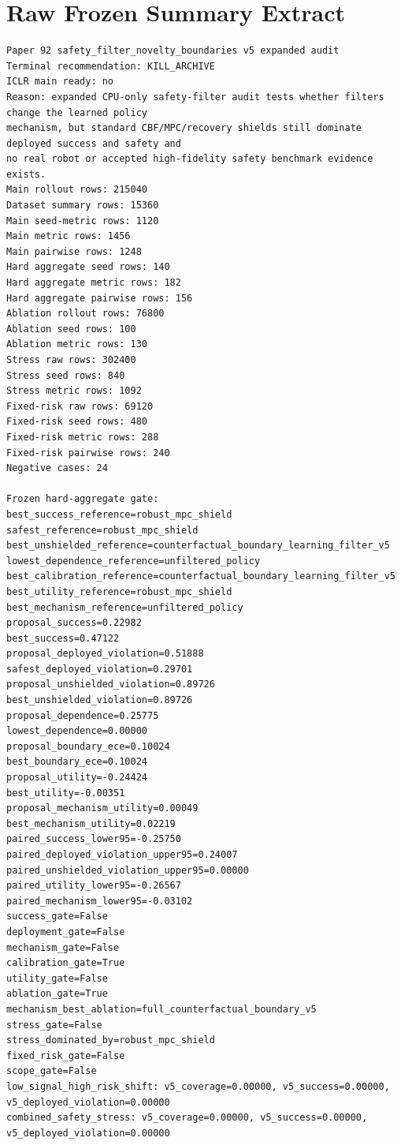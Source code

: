 \documentclass{article}
\begin{document}
\section{Raw Frozen Summary Extract}
\begin{tiny}
\begin{verbatim}
Paper 92 safety_filter_novelty_boundaries v5 expanded audit
Terminal recommendation: KILL_ARCHIVE
ICLR main ready: no
Reason: expanded CPU-only safety-filter audit tests whether filters change the learned policy
mechanism, but standard CBF/MPC/recovery shields still dominate deployed success and safety and
no real robot or accepted high-fidelity safety benchmark evidence exists.
Main rollout rows: 215040
Dataset summary rows: 15360
Main seed-metric rows: 1120
Main metric rows: 1456
Main pairwise rows: 1248
Hard aggregate seed rows: 140
Hard aggregate metric rows: 182
Hard aggregate pairwise rows: 156
Ablation rollout rows: 76800
Ablation seed rows: 100
Ablation metric rows: 130
Stress raw rows: 302400
Stress seed rows: 840
Stress metric rows: 1092
Fixed-risk raw rows: 69120
Fixed-risk seed rows: 480
Fixed-risk metric rows: 288
Fixed-risk pairwise rows: 240
Negative cases: 24

Frozen hard-aggregate gate:
best_success_reference=robust_mpc_shield
safest_reference=robust_mpc_shield
best_unshielded_reference=counterfactual_boundary_learning_filter_v5
lowest_dependence_reference=unfiltered_policy
best_calibration_reference=counterfactual_boundary_learning_filter_v5
best_utility_reference=robust_mpc_shield
best_mechanism_reference=unfiltered_policy
proposal_success=0.22982
best_success=0.47122
proposal_deployed_violation=0.51888
safest_deployed_violation=0.29701
proposal_unshielded_violation=0.89726
best_unshielded_violation=0.89726
proposal_dependence=0.25775
lowest_dependence=0.00000
proposal_boundary_ece=0.10024
best_boundary_ece=0.10024
proposal_utility=-0.24424
best_utility=-0.00351
proposal_mechanism_utility=0.00049
best_mechanism_utility=0.02219
paired_success_lower95=-0.25750
paired_deployed_violation_upper95=0.24007
paired_unshielded_violation_upper95=0.00000
paired_utility_lower95=-0.26567
paired_mechanism_lower95=-0.03102
success_gate=False
deployment_gate=False
mechanism_gate=False
calibration_gate=True
utility_gate=False
ablation_gate=True
mechanism_best_ablation=full_counterfactual_boundary_v5
stress_gate=False
stress_dominated_by=robust_mpc_shield
fixed_risk_gate=False
scope_gate=False
low_signal_high_risk_shift: v5_coverage=0.00000, v5_success=0.00000,
v5_deployed_violation=0.00000
combined_safety_stress: v5_coverage=0.00000, v5_success=0.00000, v5_deployed_violation=0.00000


\end{verbatim}
\end{tiny}
\end{document}
